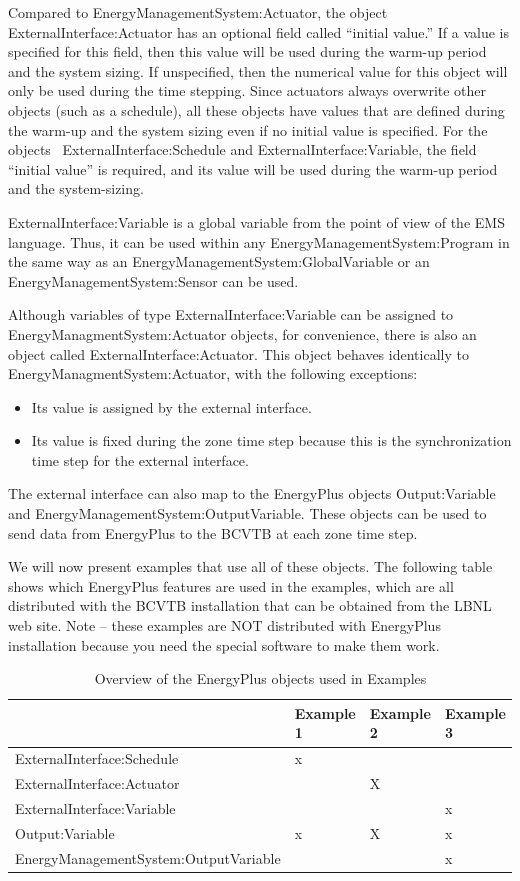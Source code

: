Compared to EnergyManagementSystem:Actuator, the object ExternalInterface:Actuator has an optional field called ``initial value.'' If a value is specified for this field, then this value will be used during the warm-up period and the system sizing. If unspecified, then the numerical value for this object will only be used during the time stepping. Since actuators always overwrite other objects (such as a schedule), all these objects have values that are defined during the warm-up and the system sizing even if no initial value is specified. For the objects~ ExternalInterface:Schedule and ExternalInterface:Variable, the field ``initial value'' is required, and its value will be used during the warm-up period and the system-sizing.

ExternalInterface:Variable is a global variable from the point of view of the EMS language. Thus, it can be used within any EnergyManagementSystem:Program in the same way as an EnergyManagementSystem:GlobalVariable or an EnergyManagementSystem:Sensor can be used.

Although variables of type ExternalInterface:Variable can be assigned to EnergyManagmentSystem:Actuator objects, for convenience, there is also an object called ExternalInterface:Actuator. This object behaves identically to EnergyManagmentSystem:Actuator, with the following exceptions:

\begin{itemize}
\item
  Its value is assigned by the external interface.
\item
  Its value is fixed during the zone time step because this is the synchronization time step for the external interface.
\end{itemize}

The external interface can also map to the EnergyPlus objects Output:Variable and EnergyManagementSystem:OutputVariable. These objects can be used to send data from EnergyPlus to the BCVTB at each zone time step.

We will now present examples that use all of these objects. The following table shows which EnergyPlus features are used in the examples, which are all distributed with the BCVTB installation that can be obtained from the LBNL web site. Note -- these examples are NOT distributed with EnergyPlus installation because you need the special software to make them work.

\begin{longtable}[c]{@{}llll@{}}
\caption{Overview of the EnergyPlus objects used in Examples \protect \label{table:overview-of-the-energyplus-objects-used-in}}\\
\toprule 
~ & Example 1 & Example 2 & Example 3 \tabularnewline \midrule
\endhead
ExternalInterface:Schedule & x & ~ & ~ \tabularnewline
ExternalInterface:Actuator & ~ & X & ~ \tabularnewline
ExternalInterface:Variable & ~ & ~ & x \tabularnewline
Output:Variable & x & X & x \tabularnewline
EnergyManagementSystem:OutputVariable & ~ & ~ & x \tabularnewline
\bottomrule
\end{longtable}

